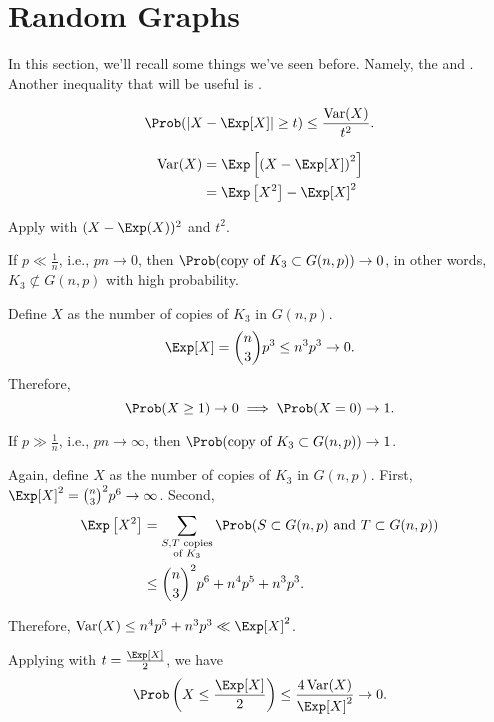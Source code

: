 \newpage
\section{Random Graphs}

In this section, we'll recall some things we've seen before. Namely, the  and . Another inequality that will be useful is .

\begin{lem}\label{lem:chebychevinq}
	\[
		\Prob(|X - \Exp[X]| \ge t ) \le \frac{\Var(X)}{t^2}.
	\]
\end{lem}

\begin{defn}[Variance]\label{defn:variance}
	\begin{align*}
		\Var(X) &= \Exp\left[\left(X - \Exp[X]\right)^2\right] \\
				&= \Exp\left[X^2\right] - \Exp[X]^2
	\end{align*}
\end{defn}

\begin{sk}
	Apply  with $(X-\Exp(X))^2$ and $t^2$.
\end{sk}

\begin{prop}
	If $p \ll \frac{1}{n}$, i.e., $pn \to 0$, then $\Prob(\text{copy of } K_3 \subset G(n, p)) \to 0$, in other words, $K_3 \not\subset G(n, p)$ with high probability.
\end{prop}

\begin{dem}
	Define $X$ as the number of copies of $K_3$ in $G(n, p)$. \[ \Exp[X] = \binom{n}{3} p^3 \le n^3p^3 \to 0.\]
	Therefore, \[ \Prob(X \ge 1) \to 0 \implies \Prob(X = 0) \to 1. \]	
\end{dem}

\begin{prop}
	If $p \gg \frac{1}{n}$, i.e., $pn \to \infty$, then $\Prob(\text{copy of } K_3 \subset G(n, p)) \to 1$.
\end{prop}

\begin{dem}
	Again, define $X$ as the number of copies of $K_3$ in $G(n, p)$. First, $\Exp[X]^2 = \binom{n}{3}^2p^6 \to \infty$. Second,
	\begin{align*} \Exp\left[X^2\right] &= \sum_{\substack{S, T\text{ copies}\\\text{of }K_3}} \Prob(S \subset G(n, p) \text{ and } T \subset G(n, p)) \\
		&\le \binom{n}{3}^2p^6 + n^4p^5 + n^3p^3.
	\end{align*}

	Therefore, $\Var(X) \le n^4p^5 + n^3p^3 \ll \Exp[X]^2$.
	
	Applying  with $t = \frac{\Exp[X]}{2}$, we have
	\[
		\Prob\left(X \le \frac{\Exp[X]}{2}\right) \le \frac{4\Var(X)}{\Exp[X]^2} \to 0.
	\]
\end{dem}

